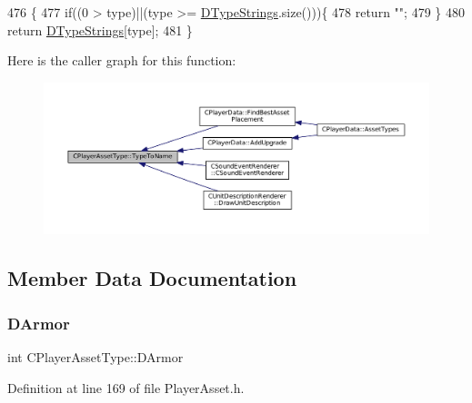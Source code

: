 \begin{DoxyCode}
476                                                      \{
477     \textcolor{keywordflow}{if}((0 > type)||(type >= \hyperlink{classCPlayerAssetType_a1f87f6f8c42b692a500c875e9359a438}{DTypeStrings}.size()))\{
478         \textcolor{keywordflow}{return} \textcolor{stringliteral}{""};
479     \}
480     \textcolor{keywordflow}{return} \hyperlink{classCPlayerAssetType_a1f87f6f8c42b692a500c875e9359a438}{DTypeStrings}[type];
481 \}
\end{DoxyCode}
Here is the caller graph for this function\+:
\nopagebreak
\begin{figure}[H]
\begin{center}
\leavevmode
\includegraphics[width=350pt]{classCPlayerAssetType_a66ce89c35b74940e9fc947a1f4b9e770_icgraph}
\end{center}
\end{figure}


\subsection{Member Data Documentation}
\hypertarget{classCPlayerAssetType_ac211254f807a497099509a3e96f7185a}{}\label{classCPlayerAssetType_ac211254f807a497099509a3e96f7185a} 
\subsubsection{\texorpdfstring{D\+Armor}{DArmor}}
{\footnotesize\ttfamily int C\+Player\+Asset\+Type\+::\+D\+Armor\hspace{0.3cm}{\ttfamily [protected]}}



Definition at line 169 of file Player\+Asset.\+h.

\hypertarget{classCPlayerAssetType_a76d89bd6479ac30a0452d0a8aaf731c5}{}\label{classCPlayerAssetType_a76d89bd6479ac30a0452d0a8aaf731c5} 
